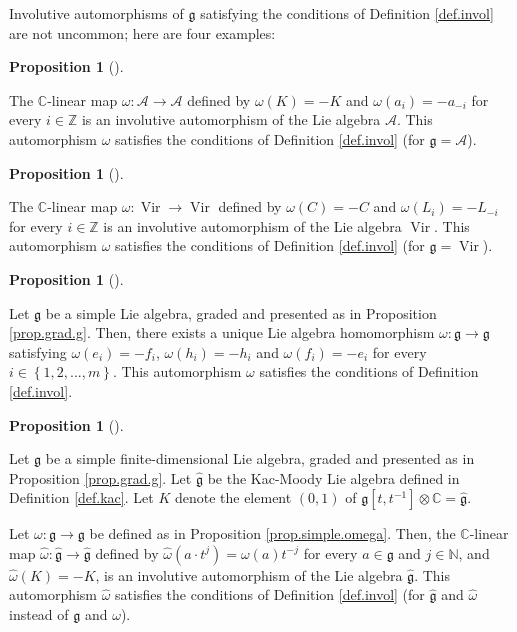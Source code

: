 \documentclass
[numbers=enddot,12pt,final,onecolumn,german,notitlepage]{scrartcl}%
\theoremstyle{definition}
\newtheorem{prop}[theo]{Proposition}
\newenvironment{proposition}[1][]
{\begin{prop}[#1]\begin{leftbar}}
{\end{leftbar}\end{prop}}
\begin{document}
Involutive automorphisms of $\mathfrak{g}$ satisfying the conditions of
Definition \ref{def.invol} are not uncommon; here are four examples:

\begin{proposition}
The $\mathbb{C}$-linear map $\omega:\mathcal{A}\rightarrow\mathcal{A}$ defined
by $\omega\left(  K\right)  =-K$ and $\omega\left(  a_{i}\right)  =-a_{-i}$
for every $i\in\mathbb{Z}$ is an involutive automorphism of the Lie algebra
$\mathcal{A}$. This automorphism $\omega$ satisfies the conditions of
Definition \ref{def.invol} (for $\mathfrak{g}=\mathcal{A}$).
\end{proposition}

\begin{proposition}
The $\mathbb{C}$-linear map $\omega:\operatorname*{Vir}\rightarrow
\operatorname*{Vir}$ defined by $\omega\left(  C\right)  =-C$ and
$\omega\left(  L_{i}\right)  =-L_{-i}$ for every $i\in\mathbb{Z}$ is an
involutive automorphism of the Lie algebra $\operatorname*{Vir}$. This
automorphism $\omega$ satisfies the conditions of Definition \ref{def.invol}
(for $\mathfrak{g}=\operatorname*{Vir}$).
\end{proposition}

\begin{proposition}
\label{prop.simple.omega}Let $\mathfrak{g}$ be a simple Lie algebra, graded
and presented as in Proposition \ref{prop.grad.g}. Then, there exists a unique
Lie algebra homomorphism $\omega:\mathfrak{g}\rightarrow\mathfrak{g}$
satisfying $\omega\left(  e_{i}\right)  =-f_{i}$, $\omega\left(  h_{i}\right)
=-h_{i}$ and $\omega\left(  f_{i}\right)  =-e_{i}$ for every $i\in\left\{
1,2,...,m\right\}  $. This automorphism $\omega$ satisfies the conditions of
Definition \ref{def.invol}.
\end{proposition}

\begin{proposition}
Let $\mathfrak{g}$ be a simple finite-dimensional Lie algebra, graded and
presented as in Proposition \ref{prop.grad.g}. Let $\widehat{\mathfrak{g}}$ be
the Kac-Moody Lie algebra defined in Definition \ref{def.kac}. Let $K$ denote
the element $\left(  0,1\right)  $ of $\mathfrak{g}\left[  t,t^{-1}\right]
\otimes\mathbb{C}=\widehat{\mathfrak{g}}$.

Let $\omega:\mathfrak{g}\rightarrow\mathfrak{g}$ be defined as in Proposition
\ref{prop.simple.omega}. Then, the $\mathbb{C}$-linear map $\widehat{\omega
}:\widehat{\mathfrak{g}}\rightarrow\widehat{\mathfrak{g}}$ defined by
$\widehat{\omega}\left(  a\cdot t^{j}\right)  =\omega\left(  a\right)  t^{-j}$
for every $a\in\mathfrak{g}$ and $j\in\mathbb{N}$, and $\widehat{\omega
}\left(  K\right)  =-K$, is an involutive automorphism of the Lie algebra
$\widehat{\mathfrak{g}}$. This automorphism $\widehat{\omega}$ satisfies the
conditions of Definition \ref{def.invol} (for $\widehat{\mathfrak{g}}$ and
$\widehat{\omega}$ instead of $\mathfrak{g}$ and $\omega$).
\end{proposition}
\end{document}
